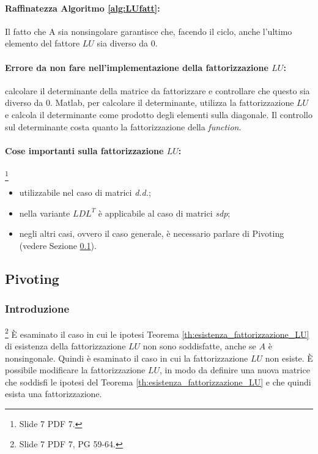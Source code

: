 \paragraph{Raffinatezza Algoritmo \ref{alg:LUfatt}:} Il fatto che A sia \gls{nonsingolare} garantisce che, facendo il ciclo, anche l'ultimo elemento del fattore $LU$ sia diverso da 0.

\paragraph{Errore da non fare nell'implementazione della fattorizzazione $LU$:} calcolare il determinante della matrice da fattorizzare e controllare che questo sia diverso da 0. Matlab, per calcolare il determinante, utilizza la fattorizzazione $LU$ e calcola il determinante come prodotto degli elementi sulla diagonale. Il controllo sul determinante costa quanto la fattorizzazione della \textit{function}.

\paragraph{Cose importanti sulla fattorizzazione $LU$:}\footnote{Slide 7 PDF 7.}
\begin{itemize}
    \item utilizzabile nel caso di matrici \textit{d.d.};
    \item nella variante $LDL^T$ è applicabile al caso di matrici \textit{sdp};
    \item negli altri casi, ovvero il caso generale, è necessario parlare di Pivoting (vedere Sezione \ref{ssec:pivoting}).
\end{itemize}

\subsection{Pivoting}\label{ssec:pivoting}
\subsubsection{Introduzione}
\footnote{Slide 7 PDF 7, PG 59-64.}
È esaminato il caso in cui le ipotesi Teorema \ref{th:esistenza_fattorizzazione_LU} di esistenza della fattorizzazione $LU$ non sono soddisfatte, anche se $A$ è nonsingonale. Quindi è esaminato il caso in cui la fattorizzazione $LU$ non esiste. È possibile modificare la fattorizzazione $LU$, in modo da definire una nuova matrice che soddisfi le ipotesi del Teorema \ref{th:esistenza_fattorizzazione_LU} e che quindi esista una fattorizzazione.

